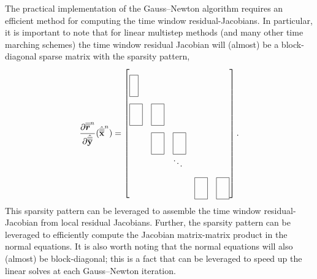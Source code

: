 The practical implementation of the Gauss--Newton algorithm requires an efficient method for computing the time window residual-Jacobians. In particular, it is important to note that for linear multistep methods (and many other time marching schemes) the time window residual Jacobian will (almost) be a block-diagonal 
sparse matrix with the sparsity pattern,
\begin{equation*}
\frac{\partial \residLMSSlabArg{n}}{\partial \genstatecollocMatySlabArg{}}(\genstatecollocMatSlabArg{n})  =
 \begin{bmatrix*}[l]
\matshapeb & \\%
 \matshapea & \matshapea & \\%
 & \matshapea  & \matshapea & \\%
&  & \ddots & \\%
 & &  & \matshapea &  \matshapea 
\end{bmatrix*}.
\end{equation*}
This sparsity pattern can be leveraged to assemble the time window residual-Jacobian from local residual Jacobians. 
Further, the sparsity pattern can be 
leveraged to efficiently compute the Jacobian matrix-matrix product in the normal equations.
It is also worth noting that the 
normal equations will also (almost) be block-diagonal; this is a fact that can be leveraged to speed up the linear solves at each Gauss--Newton iteration.

